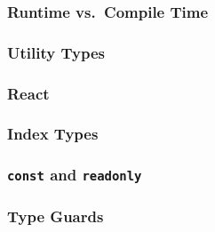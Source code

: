 \documentclass{beamer}
\begin{document}




\begin{frame}
  \frametitle{Runtime vs.\ Compile Time}
\end{frame}

\begin{frame}
  \frametitle{Utility Types}
\end{frame}

\begin{frame}
  \frametitle{React}
\end{frame}

\begin{frame}
  \frametitle{Index Types}
\end{frame}

\begin{frame}
  \frametitle{\texttt{const} and \texttt{readonly}}
\end{frame}

\begin{frame}
  \frametitle{Type Guards}
\end{frame}
\end{document}

